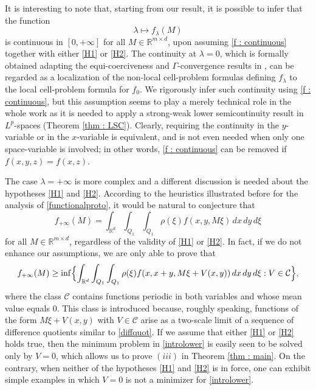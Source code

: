 \documentclass{article}
\theoremstyle{definition}
\newcommand{\R}{\mathbb{R}}
\begin{document}
It is interesting to note that, starting from our result, it is possible to infer that the function
\begin{equation*}
   \lambda \mapsto f_\lambda(M)
\end{equation*}
is continuous in $[0,+\infty]$ for all $M\in \R^{m\times d}$, upon assuming \eqref{f : continuous} together with either \eqref{H1} or \eqref{H2}. The continuity at $\lambda=0$, which is formally obtained adapting the equi-coerciveness and $\Gamma$-convergence results in \cite{P1, P2}, can be regarded as a localization of the non-local cell-problem formulas defining $f_\lambda$ to the local cell-problem formula for $f_0$. We rigorously infer such continuity using \eqref{f : continuous}, but this assumption seems to play a merely technical role in the whole work as it is needed to apply a strong-weak lower semicontinuity result in $L^p$-spaces (Theorem \ref{thm : LSC}). Clearly, requiring the continuity in the $y$-variable or in the $x$-variable is equivalent, and is not even needed when only one space-variable is involved; in other words, \eqref{f : continuous} can be removed if $f(x,y,z)=f(x,z)$. 

The case $\lambda=+\infty$ is more complex and a different discussion is needed about the hypotheses \eqref{H1} and \eqref{H2}. According to the heuristics illustrated before for the analysis of \eqref{functionalproto}, it would be natural to conjecture that
\begin{equation*}
f_{+\infty}(M)= \int_{\R^d} \int_{Q_1}\int_{Q_1}\rho(\xi) f(x,y,M\xi)\, dx\, dy\,d\xi
\end{equation*}
for all $M\in \R^{m\times d}$, regardless of the validity of \eqref{H1} or \eqref{H2}. In fact, if we do not enhance our assumptions, we are only able to prove that 
\begin{equation}\label{introlower}
           f_{+\infty}(M)\geq\inf\Bigl\{ \int_{\R^d} \int_{Q_1}\int_{Q_1} \rho(\xi)f(x,x+y,M\xi+V(x,y))\,dx\, dy\,d\xi : V\in\mathcal{C}\Bigr\},
        \end{equation}
where the class $\mathcal{C}$ contains functions periodic in both variables and whose mean value equals $0$. This class is introduced because, roughly speaking, functions of the form $M\xi+V(x,y)$ with $V\in\mathcal{C}$ arise as a two-scale limit of a sequence of difference quotients similar to \eqref{diffquot}. If we assume that either \eqref{H1} or \eqref{H2} holds true, then the minimum problem in \eqref{introlower} is easily seen to be solved only by $V=0$, which allows us to prove $(iii)$ in Theorem \ref{thm : main}. On the contrary, when neither of the hypotheses \eqref{H1} and \eqref{H2} is in force, one can exhibit simple examples in which $V=0$ is not a minimizer for \eqref{introlower}.
\end{document}
